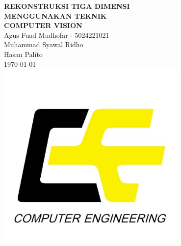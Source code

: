 \documentclass[12pt,a4paper]{article}
\begin{document}
\begin{titlepage}
    \begin{center}
        {\LARGE \textbf{
            REKONSTRUKSI TIGA DIMENSI\\
            MENGGUNAKAN TEKNIK\\[0.4cm]
            COMPUTER VISION
        }}\\[1.5cm]
        {\large Agus Fuad Mudhofar - 5024221021}\\[0.3cm]
        {\large Muhammad Syawal Ridho}\\[0.3cm]
        {\large Hasan Palito }\\[0.5cm]
        {\large \today}\\
        \includegraphics[width=0.7\textwidth]{Computer-Engineering-1.jpg}\\[1cm]
    \end{center}
\end{titlepage}
\thispagestyle{empty}

\end{document}
